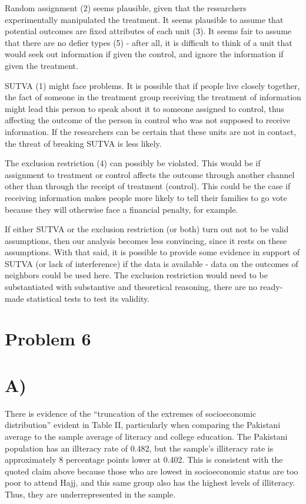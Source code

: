 \documentclass[
]{article}
\begin{document}
Random assignment (2) seems plausible, given that the researchers
experimentally manipulated the treatment. It seems plausible to assume
that potential outcomes are fixed attributes of each unit (3). It seems
fair to assume that there are no defier types (5) - after all, it is
difficult to think of a unit that would seek out information if given
the control, and ignore the information if given the treatment.

SUTVA (1) might face problems. It is possible that if people live
closely together, the fact of someone in the treatment group receiving
the treatment of information might lead this person to speak about it to
someone assigned to control, thus affecting the outcome of the person in
control who was not supposed to receive information. If the researchers
can be certain that these units are not in contact, the threat of
breaking SUTVA is less likely.

The exclusion restriction (4) can possibly be violated. This would be if
assignment to treatment or control affects the outcome through another
channel other than through the receipt of treatment (control). This
could be the case if receiving information makes people more likely to
tell their families to go vote because they will otherwise face a
financial penalty, for example.

If either SUTVA or the exclusion restriction (or both) turn out not to
be valid assumptions, then our analysis becomes less convincing, since
it rests on these assumptions. With that said, it is possible to provide
some evidence in support of SUTVA (or lack of interference) if the data
is available - data on the outcomes of neighbors could be used here. The
exclusion restriction would need to be substantiated with substantive
and theoretical reasoning, there are no ready-made statistical tests to
test its validity.

\hypertarget{problem-6}{%
\section{Problem 6}\label{problem-6}}

\hypertarget{a-1}{%
\section{A)}\label{a-1}}

There is evidence of the ``truncation of the extremes of socioeconomic
distribution'' evident in Table II, particularly when comparing the
Pakistani average to the sample average of literacy and college
education. The Pakistani population has an illteracy rate of 0.482, but
the sample's illiteracy rate is approximately 8 percentage points lower
at 0.402. This is consistent with the quoted claim above because those
who are lowest in socioeconomic status are too poor to attend Hajj, and
this same group also has the highest levels of illiteracy. Thus, they
are underrepresented in the sample.
\end{document}
